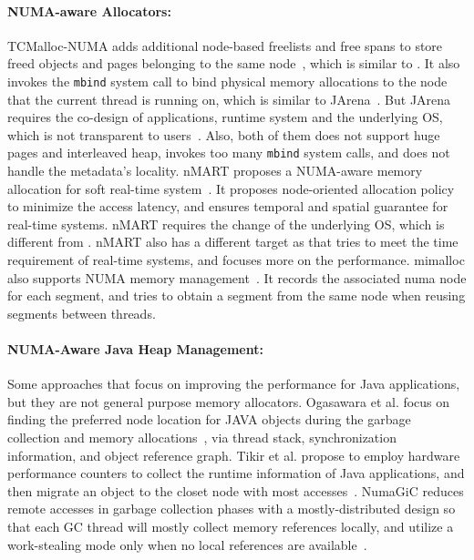 \paragraph{NUMA-aware Allocators:} TCMalloc-NUMA adds additional node-based freelists and free spans to store freed objects and pages belonging to the same node~\cite{tcmallocnew}, which is similar to \NM{}. It also invokes the \texttt{mbind} system call to bind physical memory allocations to the node that the current thread is running on, which is similar to JArena~\cite{yang2019jarena}. But JArena requires the co-design of applications, runtime system and the underlying OS, which is not transparent to users~\cite{yang2019jarena}. Also, both of them does not support huge pages and interleaved heap, invokes too many \texttt{mbind} system calls, and does not handle the metadata's locality. nMART proposes a NUMA-aware memory allocation for soft real-time system~\cite{kim2013node}. It proposes node-oriented allocation policy to minimize the access latency, and ensures temporal and spatial guarantee for real-time systems. nMART requires the change of the underlying OS, which is different from \NM{}. nMART also has a different target as \NM{} that tries to meet the time requirement of real-time systems, and \NM{} focuses more on the performance. mimalloc also supports NUMA memory management~\cite{mimalloc}. It records the associated numa node for each segment, and tries to obtain a segment from the same node when reusing segments between threads. 


\paragraph{NUMA-Aware Java Heap Management:} Some approaches that focus on improving the performance for Java applications, but they are not general purpose memory allocators. Ogasawara et al. focus on finding the preferred node location for JAVA objects during the garbage collection and memory allocations~\cite{Ogasawara:2009:NMM:1640089.1640117}, via thread stack, synchronization information, and object reference graph. Tikir et al. propose to employ hardware performance counters to collect the runtime information of Java applications, and then migrate an object to the closet node with most accesses~\cite{1419934}. 
NumaGiC reduces remote accesses in garbage collection phases with a mostly-distributed design so that each GC thread will mostly collect memory references locally, and utilize a work-stealing mode only when no local references are available~\cite{NumaGiC}.



